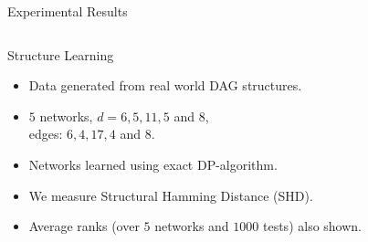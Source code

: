 \documentclass[final]{beamer}
\newcommand{\heading}[1]{\alert{\large #1}\\}
\begin{document}
\begin{frame}{}
\begin{block}{Experimental Results}
  \begin{columns}[T]
    \begin{column}{0.4\textwidth}
      \heading{Structure Learning}
      
      \begin{minipage}{0.3\textwidth}
      
      \begin{itemize}
	  \item Data generated from real world DAG structures.
	  \item $5$ networks, $d  = 6,5,11,5$ and $8$, \\ edges: $ 6,4,17,4$ and $8$. 
	  \item Networks learned using exact DP-algorithm.
	  \item We measure Structural Hamming Distance (SHD).
	  \end{itemize}

	  \end{minipage}
      \begin{minipage}{0.35\textwidth}
      	\phantom{dsaasdasdasdasd}
		\begin{itemize}
	  	\item Average ranks (over $5$ networks and $1000$ tests) also shown.
	  	\end{itemize}      
      

\end{minipage}
\end{column}
\end{columns}
\end{block}
\end{frame}
\end{document}
